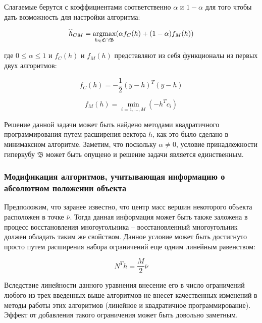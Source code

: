 \documentclass[a4paper, 12pt, titlepage]{article}
\theoremstyle{definition}
\theoremstyle{plain}
\theoremstyle{plain}
\begin{document}
Слагаемые берутся с коэффициентами соответственно $\alpha$ и $1 - \alpha$ для
того чтобы дать возможность для настройки алгоритма:

\begin{equation}
\widehat{h}_{CM} =
\operatornamewithlimits{argmax}_{h \in \mathfrak{C} \cap \mathfrak{B}}
(\alpha f_{C}(h) + (1 - \alpha) f_{M}(h))
\end{equation}

где $0 \leq \alpha \leq 1$ и $f_{C}(h)$ и $f_{M}(h)$ представляют из себя
функционалы из первых двух алгоритмов:

\begin{equation}
f_{C}(h) = - \frac{1}{2} (y - h)^{T} (y - h)
\end{equation}

\begin{equation}
f_{M}(h) = \min_{i = 1, \ldots, M} (- h^{T} c_{i})
\end{equation}

Решение данной задачи может быть найдено методами квадратичного
программирования путем расширения вектора $h$, как это было сделано в
минимаксном алгоритме. Заметим, что поскольку $\alpha \neq 0$, условие
принадлежности гиперкубу $\mathfrak{B}$ может быть опущено и решение задачи
является единственным.

\subsubsection{Модификация алгоритмов, учитывающая информацию о абсолютном
положении объекта}
\label{sec:support-methods:2d-uniform:absolute-location}

Предположим, что заранее известно, что центр масс вершин некоторого объекта
расположен в точке $\overline{\nu}$. Тогда данная информация может быть также
заложена в процесс восстановления многоугольника -- восстановленный
многоугольник должен обладать таким же свойством. Данное условие может быть
достигнуто просто путем расширения набора ограничений еще одним линейным
равенством:

\begin{equation}
N^{T} h = \frac{M}{2} \overline{\nu}
\end{equation}

Вследствие линейности данного уравнения внесение его в число ограничений любого
из трех введенных выше алгоритмов не внесет качественных изменений в методы
работы этих алгоритмов (линейное и квадратичное программирование). Эффект от
добавления такого ограничения может быть довольно заметным.
\end{document}
